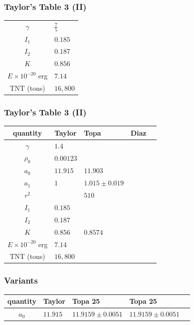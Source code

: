 \begin{frame}\frametitle{Taylor's Table 3 (II)}
\begin{table}[htp]
\begin{center}
	\begin{tabular}{cl}
		$\gamma$	& $\frac{7}{5}$ \\
		$I_{1}$		& $0.185$ \\ 
		$I_{2}$		& $0.187$ \\
		$K$ 			& $0.856$ \\ 
		$E \times 10^{-20}$ erg	& $7.14$ \\
		TNT (tons)	& $16,800$
	\end{tabular}
\end{center}
\label{tab:tab-3}
\end{table}%
\end{frame}

\begin{frame}\frametitle{Taylor's Table 3 (II)}
\begin{table}[htp]
\begin{center}
	\begin{tabular}{cllll}
		quantity	& Taylor & Topa & Diaz \\ \hline
		$\gamma$	& $1.4$ \\
		$\rho_{0}$		& $0.00123$ \\
		$a_{0}$	&	$11.915$ & $11.903$ \\
		$a_{1}$	&	$1$ & $1.015 \pm 0.019$ \\
		$r^{2}$ & & $510$ \\
		$I_{1}$		& $0.185$ \\ 
		$I_{2}$		& $0.187$ \\
		$K$ 			& $0.856$ & $0.8574$ \\ 
		$E \times 10^{-20}$ erg	& $7.14$ \\
		TNT (tons)	& $16,800$
	\end{tabular}
\end{center}
\label{tab:tab-3A}
\end{table}%
\end{frame}

\begin{frame}\frametitle{Variants}
\begin{table}[htp]
\begin{center}
	\begin{tabular}{cllll}
		quantity	& Taylor & Topa 25 & Topa 25 \\ \hline
		$a_{0}$	& $11.915$  & $11.9159 \pm 0.0051$ & $11.9159 \pm 0.0051$ \\
	\end{tabular}
\end{center}
\label{tab:reproduce}
\end{table}%
\end{frame}

